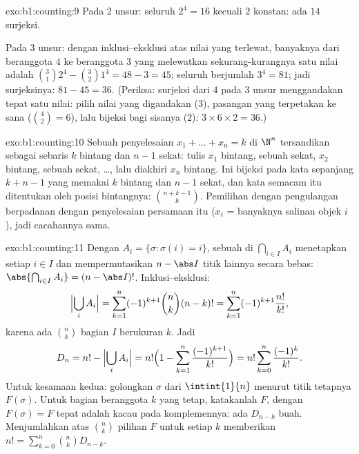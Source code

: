 \begin{solution}{exo:b1:counting:9}
Pada $2$ unsur: seluruh $2^4 = 16$  kecuali $2$  konstan:
ada $14$ surjeksi.

Pada $3$ unsur: dengan inklusi--eksklusi atas nilai yang terlewat,
banyaknya  dari  beranggota $4$ ke  beranggota $3$ yang melewatkan sekurang-kurangnya satu nilai
adalah $\binom 31 2^4 - \binom 32 1^4 = 48 - 3 = 45$; seluruh  berjumlah $3^4 =
81$; jadi surjeksinya: $81 - 45 = 36$. (Periksa: surjeksi dari $4$ pada
$3$ unsur menggandakan tepat satu nilai: pilih nilai yang digandakan
($3$), pasangan yang terpetakan ke sana ($\binom 42 = 6$), lalu bijeksi bagi
sisanya ($2$): $3 \times 6 \times 2 = 36$.)
\end{solution}

\begin{solution}{exo:b1:counting:10}
Sebuah penyelesaian $x_1 + \dots + x_n = k$ di $\N^n$ tersandikan sebagai sebaris
$k$ bintang dan $n - 1$ sekat: tulis $x_1$ bintang, sebuah sekat, $x_2$ bintang, sebuah
sekat, \dots, lalu diakhiri $x_n$ bintang. Ini bijeksi pada
kata sepanjang $k + n - 1$ yang memakai $k$ bintang dan $n - 1$ sekat, dan
kata semacam itu ditentukan oleh posisi bintangnya:
$\binom{n + k - 1}{k}$. Pemilihan dengan pengulangan berpadanan dengan
penyelesaian persamaan itu ($x_i$ = banyaknya salinan objek $i$), jadi
cacahannya sama.
\end{solution}

\begin{solution}{exo:b1:counting:11}
Dengan $A_i = \{\sigma : \sigma(i) = i\}$, sebuah  di
$\bigcap_{i \in I} A_i$ menetapkan setiap $i \in I$ dan mempermutasikan
$n - \abs I$ titik lainnya secara bebas: $\abs{\bigcap_{i \in I} A_i} =
(n - \abs I)!$. Inklusi--eksklusi:
\[
\Bigl|\bigcup_i A_i\Bigr|
= \sum_{k=1}^{n} (-1)^{k+1} \binom nk (n-k)!
= \sum_{k=1}^{n} (-1)^{k+1} \frac{n!}{k!} ,
\]
karena ada $\binom nk$  bagian $I$ berukuran $k$. Jadi
\[
D_n = n! - \Bigl|\bigcup_i A_i\Bigr|
= n!\Bigl(1 - \sum_{k=1}^{n} \frac{(-1)^{k+1}}{k!}\Bigr)
= n! \sum_{k=0}^{n} \frac{(-1)^k}{k!} .
\]
Untuk kesamaan kedua: golongkan  $\sigma$ dari
$\intint{1}{n}$ menurut  titik tetapnya $F(\sigma)$. Untuk
 bagian beranggota $k$ yang tetap, katakanlah $F$,  dengan $F(\sigma) = F$ tepat adalah
 kacau pada komplemennya: ada $D_{n-k}$ buah. Menjumlahkan atas
$\binom nk$ pilihan $F$ untuk setiap $k$ memberikan
$n! = \sum_{k=0}^{n} \binom nk D_{n-k}$.
\end{solution}

